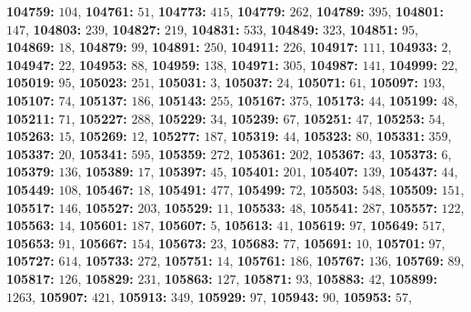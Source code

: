 \textsf{\bfseries 104759:} $104$, \textsf{\bfseries 104761:} $51$, \textsf{\bfseries 104773:} $415$, \textsf{\bfseries 104779:} $262$, \textsf{\bfseries 104789:} $395$, \textsf{\bfseries 104801:} $147$, \textsf{\bfseries 104803:} $239$, \textsf{\bfseries 104827:} $219$, \textsf{\bfseries 104831:} $533$, \textsf{\bfseries 104849:} $323$, \textsf{\bfseries 104851:} $95$, \textsf{\bfseries 104869:} $18$, \textsf{\bfseries 104879:} $99$, \textsf{\bfseries 104891:} $250$, \textsf{\bfseries 104911:} $226$, \textsf{\bfseries 104917:} $111$, \textsf{\bfseries 104933:} $2$, \textsf{\bfseries 104947:} $22$, \textsf{\bfseries 104953:} $88$, \textsf{\bfseries 104959:} $138$, \textsf{\bfseries 104971:} $305$, \textsf{\bfseries 104987:} $141$, \textsf{\bfseries 104999:} $22$, \textsf{\bfseries 105019:} $95$, \textsf{\bfseries 105023:} $251$, \textsf{\bfseries 105031:} $3$, \textsf{\bfseries 105037:} $24$, \textsf{\bfseries 105071:} $61$, \textsf{\bfseries 105097:} $193$, \textsf{\bfseries 105107:} $74$, \textsf{\bfseries 105137:} $186$, \textsf{\bfseries 105143:} $255$, \textsf{\bfseries 105167:} $375$, \textsf{\bfseries 105173:} $44$, \textsf{\bfseries 105199:} $48$, \textsf{\bfseries 105211:} $71$, \textsf{\bfseries 105227:} $288$, \textsf{\bfseries 105229:} $34$, \textsf{\bfseries 105239:} $67$, \textsf{\bfseries 105251:} $47$, \textsf{\bfseries 105253:} $54$, \textsf{\bfseries 105263:} $15$, \textsf{\bfseries 105269:} $12$, \textsf{\bfseries 105277:} $187$, \textsf{\bfseries 105319:} $44$, \textsf{\bfseries 105323:} $80$, \textsf{\bfseries 105331:} $359$, \textsf{\bfseries 105337:} $20$, \textsf{\bfseries 105341:} $595$, \textsf{\bfseries 105359:} $272$, \textsf{\bfseries 105361:} $202$, \textsf{\bfseries 105367:} $43$, \textsf{\bfseries 105373:} $6$, \textsf{\bfseries 105379:} $136$, \textsf{\bfseries 105389:} $17$, \textsf{\bfseries 105397:} $45$, \textsf{\bfseries 105401:} $201$, \textsf{\bfseries 105407:} $139$, \textsf{\bfseries 105437:} $44$, \textsf{\bfseries 105449:} $108$, \textsf{\bfseries 105467:} $18$, \textsf{\bfseries 105491:} $477$, \textsf{\bfseries 105499:} $72$, \textsf{\bfseries 105503:} $548$, \textsf{\bfseries 105509:} $151$, \textsf{\bfseries 105517:} $146$, \textsf{\bfseries 105527:} $203$, \textsf{\bfseries 105529:} $11$, \textsf{\bfseries 105533:} $48$, \textsf{\bfseries 105541:} $287$, \textsf{\bfseries 105557:} $122$, \textsf{\bfseries 105563:} $14$, \textsf{\bfseries 105601:} $187$, \textsf{\bfseries 105607:} $5$, \textsf{\bfseries 105613:} $41$, \textsf{\bfseries 105619:} $97$, \textsf{\bfseries 105649:} $517$, \textsf{\bfseries 105653:} $91$, \textsf{\bfseries 105667:} $154$, \textsf{\bfseries 105673:} $23$, \textsf{\bfseries 105683:} $77$, \textsf{\bfseries 105691:} $10$, \textsf{\bfseries 105701:} $97$, \textsf{\bfseries 105727:} $614$, \textsf{\bfseries 105733:} $272$, \textsf{\bfseries 105751:} $14$, \textsf{\bfseries 105761:} $186$, \textsf{\bfseries 105767:} $136$, \textsf{\bfseries 105769:} $89$, \textsf{\bfseries 105817:} $126$, \textsf{\bfseries 105829:} $231$, \textsf{\bfseries 105863:} $127$, \textsf{\bfseries 105871:} $93$, \textsf{\bfseries 105883:} $42$, \textsf{\bfseries 105899:} $1263$, \textsf{\bfseries 105907:} $421$, \textsf{\bfseries 105913:} $349$, \textsf{\bfseries 105929:} $97$, \textsf{\bfseries 105943:} $90$, \textsf{\bfseries 105953:} $57$, 
